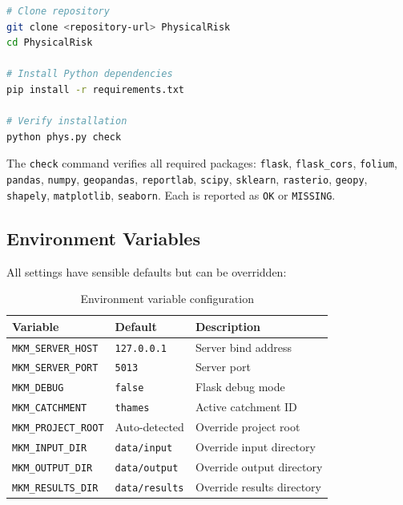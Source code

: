 \documentclass[11pt,a4paper]{article}
\begin{document}
\begin{lstlisting}[language=bash,caption={Installation steps}]
# Clone repository
git clone <repository-url> PhysicalRisk
cd PhysicalRisk

# Install Python dependencies
pip install -r requirements.txt

# Verify installation
python phys.py check
\end{lstlisting}

The \texttt{check} command verifies all required packages: \texttt{flask},
\texttt{flask\_cors}, \texttt{folium}, \texttt{pandas}, \texttt{numpy},
\texttt{geopandas}, \texttt{reportlab}, \texttt{scipy}, \texttt{sklearn},
\texttt{rasterio}, \texttt{geopy}, \texttt{shapely}, \texttt{matplotlib},
\texttt{seaborn}. Each is reported as \texttt{OK} or \texttt{MISSING}.

\subsection{Environment Variables}

All settings have sensible defaults but can be overridden:

\begin{table}[H]
    \centering
    \caption{Environment variable configuration}
    \label{tab:env_vars}
    \begin{tabular}{@{}lll@{}}
        \toprule
        \textbf{Variable} & \textbf{Default} & \textbf{Description} \\
        \midrule
        \texttt{MKM\_SERVER\_HOST}  & \texttt{127.0.0.1} & Server bind address \\
        \texttt{MKM\_SERVER\_PORT}  & \texttt{5013}       & Server port \\
        \texttt{MKM\_DEBUG}         & \texttt{false}      & Flask debug mode \\
        \texttt{MKM\_CATCHMENT}     & \texttt{thames}     & Active catchment ID \\
        \texttt{MKM\_PROJECT\_ROOT} & Auto-detected       & Override project root \\
        \texttt{MKM\_INPUT\_DIR}    & \texttt{data/input}  & Override input directory \\
        \texttt{MKM\_OUTPUT\_DIR}   & \texttt{data/output} & Override output directory \\
        \texttt{MKM\_RESULTS\_DIR}  & \texttt{data/results}& Override results directory \\
        \bottomrule
    \end{tabular}
\end{table}
\end{document}
